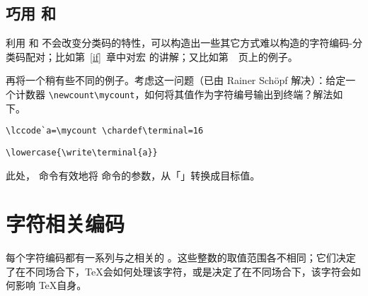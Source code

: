 \documentclass{book}
\begin{document}
\subsection{巧用  和 }

利用  和  不会改变分类码的特性，可以构造出一些其它方式难以构造的字符编码-分类码配对；比如第~\ref{if}~章中对宏  的讲解；又比如第~\pageref{spsb:truc}~页上的例子。

再将一个稍有些不同的例子。考虑这一问题（已由 Rainer Sch\"opf 解决）：给定一个计数器 \verb-\newcount\mycount-，如何将其值作为字符编号输出到终端？解法如下。
\begin{verbatim}
\lccode`a=\mycount \chardef\terminal=16
\end{verbatim}
\begin{verbatim}
\lowercase{\write\terminal{a}}
\end{verbatim}
此处， 命令有效地将  命令的参数，从「」转换成目标值。

\section{字符相关编码}
\label{codename}

每个字符编码都有一系列与之相关的 。这些整数的取值范围各不相同；它们决定了在不同场合下，\TeX 会如何处理该字符，或是决定了在不同场合下，该字符会如何影响 \TeX 自身。
\end{document}
